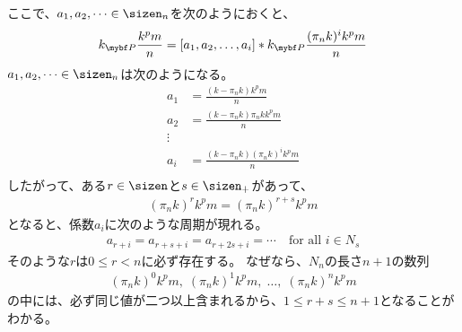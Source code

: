 	ここで、$a_1,a_2,\dots\in\sizen_n$を次のようにおくと、
	\begin{equation*}\begin{split}
		k_\bunsub\frac{k^pm}{n}
		= [a_1,a_2,\dots,a_i] * k_\bunsub\frac{(\pi_nk)^ik^pm}{n}
	\end{split}\end{equation*}
	$a_1,a_2,\dots\in\sizen_n$は次のようになる。
	\begin{equation*}\begin{split}
		a_1 &= \frac{(k - \pi_nk)k^pm}{n} \\
		a_2 &= \frac{(k - \pi_nk)\pi_nkk^pm}{n} \\
		\vdots \\
		a_i &= \frac{(k - \pi_nk)(\pi_nk)^ik^pm}{n} \\
	\end{split}\end{equation*}
	したがって、ある$r\in\sizen$と$s\in\sizen_+$があって、
	\begin{equation*}\begin{split}
		(\pi_nk)^rk^pm = (\pi_nk)^{r+s}k^pm
	\end{split}\end{equation*}
	となると、係数$a_i$に次のような周期が現れる。
	\begin{equation*}\begin{split}
		a_{r+i} = a_{r+s+i} = a_{r+2s+i} = \cdots
		\quad\text{for all }i\in N_s
	\end{split}\end{equation*}
	そのような$r$は$0\le r<n$に必ず存在する。
	なぜなら、$N_n$の長さ$n+1$の数列
	\begin{equation*}\begin{split}
		(\pi_nk)^0k^pm,\;(\pi_nk)^1k^pm,\;\dots,\;(\pi_nk)^nk^pm
	\end{split}\end{equation*}
	の中には、必ず同じ値が二つ以上含まれるから、$1\le r+s\le n+1$となることが
	わかる。

